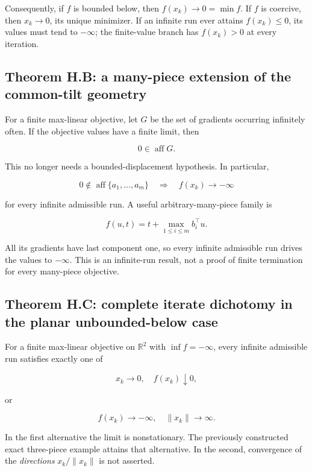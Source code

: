 Consequently, if \(f\) is bounded below, then \(f(x_k)\to0=\min f\). If
\(f\) is coercive, then \(x_k\to0\), its unique minimizer. If an
infinite run ever attains \(f(x_k)\le0\), its values must tend to
\(-\infty\); the finite-value branch has \(f(x_k)>0\) at every
iteration.

\subsection{Theorem H.B: a many-piece extension of the common-tilt
geometry}\label{H:theorem-b-a-many-piece-extension-of-the-common-tilt-geometry}

For a finite max-linear objective, let \(G\) be the set of gradients
occurring infinitely often. If the objective values have a finite limit,
then

\[
\boxed{0\in\operatorname{aff}G.}
\]

This no longer needs a bounded-displacement hypothesis. In particular,

\[
0\notin\operatorname{aff}\{a_1,\ldots,a_m\}
\quad\Longrightarrow\quad
f(x_k)\longrightarrow-\infty
\]

for every infinite admissible run. A useful arbitrary-many-piece family
is

\[
\boxed{f(u,t)=t+\max_{1\le i\le m}b_i^\top u.}
\]

All its gradients have last component one, so every infinite admissible
run drives the values to \(-\infty\). This is an infinite-run result,
not a proof of finite termination for every many-piece objective.

\subsection{Theorem H.C: complete iterate dichotomy in the planar
unbounded-below
case}\label{H:theorem-c-complete-iterate-dichotomy-in-the-planar-unbounded-below-case}

For a finite max-linear objective on \(\mathbb R^2\) with
\(\inf f=-\infty\), every infinite admissible run satisfies exactly one
of

\[
\boxed{x_k\longrightarrow0,\quad f(x_k)\downarrow0,}
\]

or

\[
\boxed{f(x_k)\longrightarrow-\infty,\quad\|x_k\|\longrightarrow\infty.}
\]

In the first alternative the limit is nonstationary. The previously
constructed exact three-piece example attains that alternative. In the
second, convergence of the \emph{directions} \(x_k/\|x_k\|\) is not
asserted.


